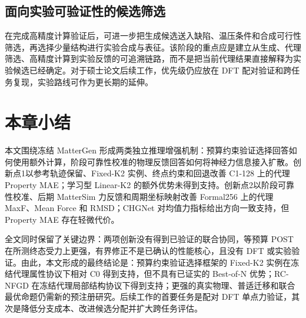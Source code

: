 \subsection{面向实验可验证性的候选筛选}

在完成高精度计算验证后，可进一步把生成候选送入缺陷、温压条件和合成可行性筛选，再选择少量结构进行实验合成与表征。该阶段的重点应是建立从生成、代理筛选、高精度计算到实验反馈的可追溯链路，而不是把当前代理结果直接解释为实验候选已经确定。对于硕士论文后续工作，优先级仍应放在 DFT 配对验证和跨任务复现，实验路线可作为更长期的延伸。

\section{本章小结}

本文围绕冻结 MatterGen 形成两类独立推理增强机制：预算约束验证选择回答如何使用额外计算，阶段可靠性校准的物理反馈回答如何将神经力信息接入扩散。创新点1以参考轨迹保留、Fixed-K2 实例、终点约束和回退改善 C1-128 上的代理 Property MAE；学习型 Linear-K2 的额外优势未得到支持。创新点2以阶段可靠性校准、后期 Matter\allowbreak Sim 力反馈和周期坐标映射改善 Formal256 上的代理 MaxF、Mean Force 和 RMSD；CHGNet 对均值力指标给出方向一致支持，但 Property MAE 存在轻微代价。

全文同时保留了关键边界：两项创新没有得到已验证的联合协同，等预算 POST 在所测终态受力上更强，有界修正不是已确认的性能核心，且没有 DFT 或实验验证。由此，本文形成的最终结论是：预算约束验证选择框架的 Fixed-K2 实例在冻结代理属性协议下相对 C0 得到支持，但不具有已证实的 Best-of-N 优势；RC-NFGD 在冻结代理局部结构协议下得到支持；更强的真实物理、普适迁移和联合最优命题仍需新的预注册研究。后续工作的首要任务是配对 DFT 单点力验证，其次是降低分支成本、改进候选分配并扩大跨任务评估。
